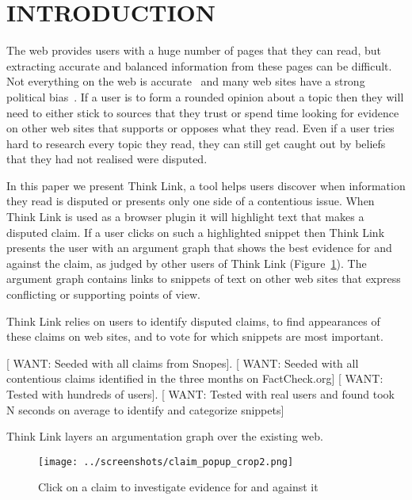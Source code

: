\documentclass{chi2009}
\newcommand{\want}[1]{{[\color{blue} WANT: #1]}}
\begin{document}

\section{INTRODUCTION}

The web provides users with a huge number of pages that they can read, but extracting accurate and balanced information from these pages can be difficult. Not everything on the web is accurate~\cite{Mintz2002,Neumann2003,Resnik1998,Zhou2004} and many web sites have a strong political bias~\cite{Herman2002,Gentzkow2007}. If a user is to form a rounded opinion about a topic then they will need to either stick to sources that they trust or spend time looking for evidence on other web sites that supports or opposes what they read. Even if a user tries hard to research every topic they read, they can still get caught out by beliefs that they had not realised were disputed.

In this paper we present Think Link, a tool helps users discover when information they read is disputed or presents only one side of a contentious issue. When Think Link is used as a browser plugin it will highlight text that makes a disputed claim. If a user clicks on such a highlighted snippet then Think Link presents the user with an argument graph that shows the best evidence for and against the claim, as judged by other users of Think Link (Figure~\ref{claimview}). The argument graph contains links to snippets of text on other web sites that express conflicting or supporting points of view.

Think Link relies on users to identify disputed claims, to find appearances of these claims on web sites, and to vote for which snippets are most important.

\want{Seeded with all claims from Snopes}.
\want{Seeded with all contentious claims identified in the three months on FactCheck.org}
\want{Tested with hundreds of users}.
\want{Tested with real users and found took N seconds on average to identify and categorize snippets}

Think Link layers an argumentation graph over the existing web. 

\begin{figure}[tb]
	\begin{center}
	\texttt{[image: ../screenshots/claim\_popup\_crop2.png]}
	\caption{Click on a claim to investigate evidence for and against it}
	\label{claimview}
	\end{center}
\end{figure}
\end{document}
